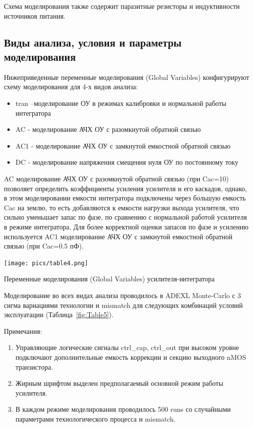 \documentclass[a4paper,12pt,oneside]{scrartcl}
\begin{document}
Схема моделирования также содержит паразитные резисторы и индуктивности источников питания.




\subsection{Виды анализа, условия и параметры моделирования}

Нижеприведенные переменные моделирования (Global Variables) конфигурируют схему моделирования для 4-х видов анализа:

\begin{itemize}
    \item tran –моделирование ОУ в режимах калибровки и нормальной работы интегратора
    \item AC - моделирование АЧХ ОУ с разомкнутой обратной связью
    \item AC1 - моделирование АЧХ ОУ с замкнутой емкостной обратной связью
    \item DC - моделирование напряжения смещения нуля ОУ по постоянному току
\end{itemize}

AC моделирование АЧХ ОУ с разомкнутой обратной связью (при Cac=10) позволяет определить коэффициенты усиления усилителя и его каскадов, однако,  в этом моделировании емкости интегратора подключены через большую  емкость Cac на землю, то есть добавляются к емкости нагрузки выхода усилителя, что сильно уменьшает запас по фазе, по сравнению с нормальной работой усилителя в режиме интегратора.
Для более корректной оценки запасов по фазе и усилению используется AC1 моделирование АЧХ ОУ с замкнутой емкостной обратной связью (при Cac=0.5 пФ).



\begin{table}[!htb]
    \centering
    \texttt{[image: pics/table4.png]}
    \caption{Переменные моделирования (Global Variables) усилителя-интегратора}
    \label{fig:Table4}
\end{table}
\FloatBarrier

Моделирование во всех видах анализа проводилось в ADEXL Monte-Carlo с 3 сигма вариациями технологии и mismatch для следующих комбинаций условий эксплуатации (Таблица~\ref{fig:Table5}).

Примечания:
\begin{enumerate}
    \item Управляющие логические сигналы ctrl\_cap, ctrl\_out при высоком уровне подключают дополнительные емкость коррекции и секцию выходного nMOS транзистора.
    \item Жирным шрифтом выделен предполагаемый основной режим работы усилителя.
    \item В каждом режиме моделирования проводилось 500 runs со случайными параметрами технологического процесса и mismatch.
\end{enumerate}
    
\end{document}

